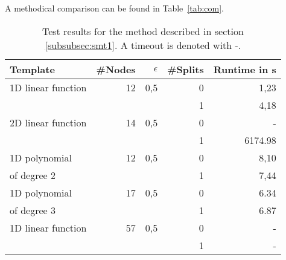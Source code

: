     A methodical comparison can be found in Table~\ref{tab:com}.\par
    \begin{table}[h]
        \centering
            \begin{tabular}{|l|r|r|r|r|}
                 \hline
                 Template &  \#Nodes    & $\epsilon$ & \#Splits     & Runtime in \si{\s}\\
                 \hline
                 \hline
                 1D linear function        &    12             & 0,5         & 0& 1,23\\
                                           &                   &           & 1& 4,18\\ \hline
                 2D linear function        &    14             & 0,5         & 0& -\\
                                           &                   &           & 1& 6174.98\\ \hline
                 1D polynomial             &    12             & 0,5         & 0& 8,10 \\
                 of degree 2               &                   &           & 1& 7,44\\ \hline
                 1D polynomial             &    17             & 0,5         & 0& 6.34\\
                 of degree 3               &                   &           & 1& 6.87\\ \hline
                 1D linear function        &    57             & 0,5         & 0& -\\
                                           &                   &           & 1& -\\ \hline
            \end{tabular}
        \caption{Test results for the method described in section \ref{subsubsec:smt1}. A timeout is denoted with -.}
        \label{tab:smt_default}
    \end{table}

